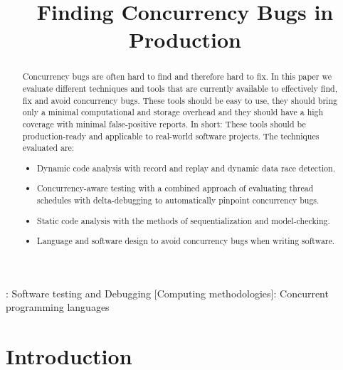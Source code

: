 \documentclass[conference]{IEEEtran}
\begin{document}
\title{Finding Concurrency Bugs in Production}

\author{
}

\maketitle

\begin{abstract}
Concurrency bugs are often hard to find and therefore hard to fix.
In this paper we evaluate different techniques and tools that are currently available to effectively find, fix and avoid concurrency bugs.
These tools should be easy to use, they should bring only a minimal computational and storage overhead and they should have a high coverage with minimal false-positive reports.
In short: These tools should be production-ready and applicable to real-world software projects.
The techniques evaluated are:
\begin{itemize}
    \item Dynamic code analysis with record and replay and dynamic data race detection.
    \item Concurrency-aware testing with a combined approach of evaluating thread schedules with delta-debugging to automatically pinpoint concurrency bugs.
    \item Static code analysis with the methods of sequentialization and model-checking.
    \item Language and software design to avoid concurrency bugs when writing software.
\end{itemize}
\end{abstract}

\begin{IEEEkeywords}
    : Software testing and Debugging
    [Computing methodologies]: Concurrent programming languages
\end{IEEEkeywords}


\section{Introduction}
\end{document}
